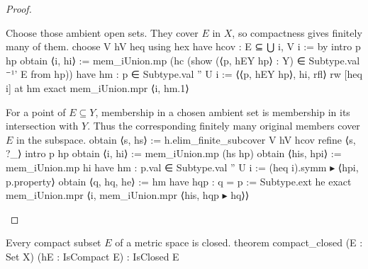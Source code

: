 \begin{proof}
  \begin{lean}{Choose those ambient open sets. They cover $E$ in $X$, so compactness gives finitely many of them.}
    choose V hV heq using hex
    have hcov : E ⊆ ⋃ i, V i := by
      intro p hp
      obtain ⟨i, hi⟩ := mem_iUnion.mp (hc (show (⟨p, hEY hp⟩ : Y) ∈ Subtype.val ⁻¹' E from hp))
      have hm : p ∈ Subtype.val '' U i := ⟨⟨p, hEY hp⟩, hi, rfl⟩
      rw [heq i] at hm
      exact mem_iUnion.mpr ⟨i, hm.1⟩
  \end{lean}

  \begin{lean}{For a point of $E\subseteq Y$, membership in a chosen ambient set is membership in its intersection with $Y$. Thus the corresponding finitely many original members cover $E$ in the subspace.}
    obtain ⟨s, hs⟩ := h.elim_finite_subcover V hV hcov
    refine ⟨s, ?_⟩
    intro p hp
    obtain ⟨i, hi⟩ := mem_iUnion.mp (hs hp)
    obtain ⟨his, hpi⟩ := mem_iUnion.mp hi
    have hm : p.val ∈ Subtype.val '' U i := (heq i).symm ▸ ⟨hpi, p.property⟩
    obtain ⟨q, hq, he⟩ := hm
    have hqp : q = p := Subtype.ext he
    exact mem_iUnion.mpr ⟨i, mem_iUnion.mpr ⟨his, hqp ▸ hq⟩⟩
  \end{lean}

\end{proof}

\begin{proposition} \label{an1:thm:compact-set-is-closed}
  \begin{lean}{Every compact subset $E$ of a metric space is closed.}
    theorem compact_closed (E : Set X) (hE : IsCompact E) : IsClosed E
  \end{lean}
\end{proposition}

